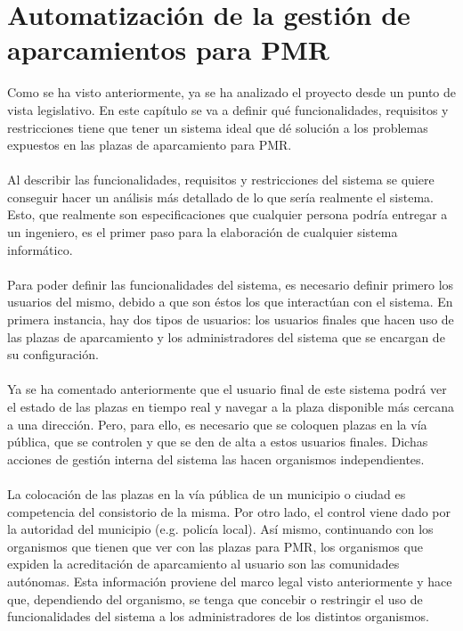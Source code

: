 \chapter{Automatización de la gestión de aparcamientos para PMR}
Como se ha visto anteriormente, ya se ha analizado el proyecto desde un punto de vista legislativo. En este capítulo se va a definir qué funcionalidades, requisitos y restricciones tiene que tener un sistema ideal que dé solución a los problemas expuestos en las plazas de aparcamiento para PMR.
\\\\
Al describir las funcionalidades, requisitos y restricciones del sistema se quiere conseguir hacer un análisis más detallado de lo que sería realmente el sistema. Esto, que realmente son especificaciones que cualquier persona podría entregar a un ingeniero, es el primer paso para la elaboración de cualquier sistema informático.
\\\\
Para poder definir las funcionalidades del sistema, es necesario definir primero los usuarios del mismo, debido a que son éstos los que interactúan con el sistema. En primera instancia, hay dos tipos de usuarios: los usuarios finales que hacen uso de las plazas de aparcamiento y los administradores del sistema que se encargan de su configuración. 
\\\\
Ya se ha comentado anteriormente que el usuario final de este sistema podrá ver el estado de las plazas en tiempo real y navegar a la plaza disponible más cercana a una dirección. Pero, para ello, es necesario que se coloquen plazas en la vía pública, que se controlen y que se den de alta a estos usuarios finales. Dichas acciones de gestión interna del sistema las hacen organismos independientes.
\\\\
La colocación de las plazas en la vía pública de un municipio o ciudad es competencia del consistorio de la misma. Por otro lado, el control viene dado por la autoridad del municipio (e.g. policía local). Así mismo, continuando con los organismos que tienen que ver con las plazas para PMR, los organismos que expiden la acreditación de aparcamiento al usuario son las comunidades autónomas. Esta información proviene del marco legal visto anteriormente y hace que, dependiendo del organismo, se tenga que concebir o restringir el uso de funcionalidades del sistema a los administradores de los distintos organismos.
\\\\
